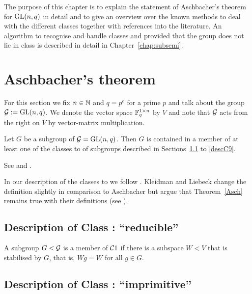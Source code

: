 The purpose of this chapter is to explain the statement of Aschbacher's 
theorem for $\GL(n,q)$ in detail and to give an overview over the known
methods to deal with the different classes together with references into
the literature. An algorithm to recognise and handle classes  and 
provided that the group does not lie in class  is described in detail
in Chapter~\ref{chap:subsemi}.

\section{Aschbacher's theorem}
\label{sect:aschbacher}

\begin{Not}
For this section we fix $n \in \mathbb{N}$ and $q=p^e$ for a prime $p$ and
talk about the group $\GG := \GL(n,q)$. We denote the vector space $\mathbb{F}_q^{1
\times n}$ by $V$ and note that $\mathcal{G}$ acts from the right on $V$ by
vector-matrix multiplication.
\end{Not}

\begin{Theo}
\label{Asch}
Let $G$ be a subgroup of\/ $\GG = \GL(n,q)$.
Then $G$ is contained in a member of at least one of the
classes  to  of subgroups described in Sections~\ref{descC1}
to \ref{descC9}.
\end{Theo}
\proofbeg See \cite{aschbacher} and \cite{kleilieb}.
\proofend

\begin{Rem}
In our description of the classes  to  we follow
\cite{kleilieb}. Kleidman and Liebeck change the definition 
slightly in comparison to Aschbacher but argue that Theorem~\ref{Asch}
remains true with their definitions (see \cite[Chapter~4]{kleilieb}).
\end{Rem}

\subsection{Description of Class : ``reducible''}
\label{descC1}

A subgroup $G < \mathcal{G}$ is a member of $\mathcal{C}1$ if there is a subspace
$W < V$ that is stabilised by $G$, that is, $Wg = W$ for all $g \in G$.

\subsection{Description of Class : ``imprimitive''}
\label{descC2}

